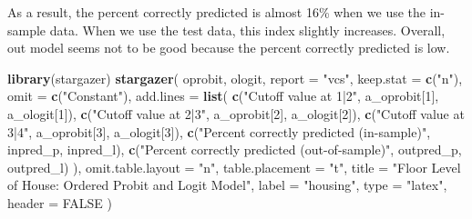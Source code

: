 \documentclass[
  12pt,
]{article}
\newenvironment{Shaded}{\begin{snugshade}}{\end{snugshade}}
\newcommand{\DataTypeTok}[1]{\textcolor[rgb]{0.13,0.29,0.53}{#1}}
\newcommand{\DecValTok}[1]{\textcolor[rgb]{0.00,0.00,0.81}{#1}}
\newcommand{\KeywordTok}[1]{\textcolor[rgb]{0.13,0.29,0.53}{\textbf{#1}}}
\newcommand{\NormalTok}[1]{#1}
\newcommand{\OtherTok}[1]{\textcolor[rgb]{0.56,0.35,0.01}{#1}}
\newcommand{\StringTok}[1]{\textcolor[rgb]{0.31,0.60,0.02}{#1}}
\begin{document}
As a result, the percent correctly predicted is almost 16\% when we use
the in-sample data. When we use the test data, this index slightly
increases. Overall, out model seems not to be good because the percent
correctly predicted is low.

\begin{Shaded}
\begin{Highlighting}[]
\KeywordTok{library}\NormalTok{(stargazer)}
\KeywordTok{stargazer}\NormalTok{(}
\NormalTok{  oprobit, ologit,}
  \DataTypeTok{report =} \StringTok{"vcs"}\NormalTok{, }\DataTypeTok{keep.stat =} \KeywordTok{c}\NormalTok{(}\StringTok{"n"}\NormalTok{),}
  \DataTypeTok{omit =} \KeywordTok{c}\NormalTok{(}\StringTok{"Constant"}\NormalTok{),}
  \DataTypeTok{add.lines =} \KeywordTok{list}\NormalTok{(}
    \KeywordTok{c}\NormalTok{(}\StringTok{"Cutoff value at 1|2"}\NormalTok{, a\_oprobit[}\DecValTok{1}\NormalTok{], a\_ologit[}\DecValTok{1}\NormalTok{]),}
    \KeywordTok{c}\NormalTok{(}\StringTok{"Cutoff value at 2|3"}\NormalTok{, a\_oprobit[}\DecValTok{2}\NormalTok{], a\_ologit[}\DecValTok{2}\NormalTok{]),}
    \KeywordTok{c}\NormalTok{(}\StringTok{"Cutoff value at 3|4"}\NormalTok{, a\_oprobit[}\DecValTok{3}\NormalTok{], a\_ologit[}\DecValTok{3}\NormalTok{]),}
    \KeywordTok{c}\NormalTok{(}\StringTok{"Percent correctly predicted (in{-}sample)"}\NormalTok{, inpred\_p, inpred\_l),}
    \KeywordTok{c}\NormalTok{(}\StringTok{"Percent correctly predicted (out{-}of{-}sample)"}\NormalTok{, outpred\_p, outpred\_l)}
\NormalTok{  ),}
  \DataTypeTok{omit.table.layout =} \StringTok{"n"}\NormalTok{, }\DataTypeTok{table.placement =} \StringTok{"t"}\NormalTok{,}
  \DataTypeTok{title =} \StringTok{"Floor Level of House: Ordered Probit and Logit Model"}\NormalTok{,}
  \DataTypeTok{label =} \StringTok{"housing"}\NormalTok{,}
  \DataTypeTok{type =} \StringTok{"latex"}\NormalTok{, }\DataTypeTok{header =} \OtherTok{FALSE}
\NormalTok{)}
\end{Highlighting}
\end{Shaded}
\end{document}
